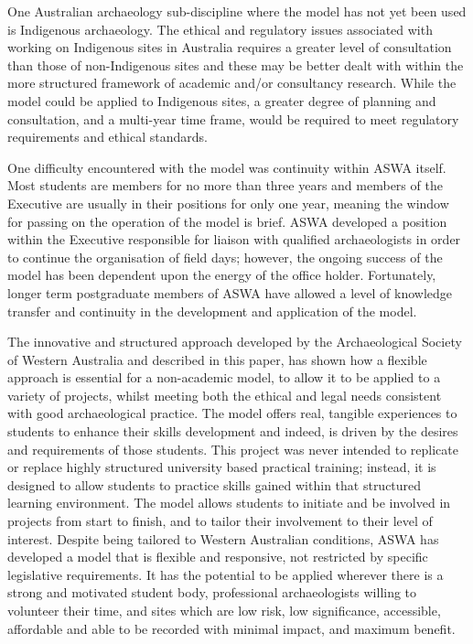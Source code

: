 \documentclass{ijsra}
\begin{document}
One Australian archaeology sub-discipline where the model has not yet been used is Indigenous archaeology. The ethical and regulatory issues associated with working on Indigenous sites in Australia requires a greater level of consultation than those of non-Indigenous sites and these may be better dealt with within the more structured framework of academic and/or consultancy research. 
While the model could be applied to Indigenous sites, a greater degree of planning and consultation, and a multi-year time frame, would be required to meet regulatory requirements and ethical standards.

One difficulty encountered with the model was continuity within ASWA itself. Most students are members for no more than three years and members of the Executive are usually in their positions for only one year, meaning the window for passing on the operation of the model is brief. 
ASWA developed a position within the Executive responsible for liaison with qualified archaeologists in order to continue the organisation of field days; however, the ongoing success of the model has been dependent upon the energy of the office holder. 
Fortunately, longer term postgraduate members of ASWA have allowed a level of knowledge transfer and continuity in the development and application of the model.


The innovative and structured approach developed by the Archaeological Society of Western Australia and described in this paper, has shown how a flexible approach is essential for a non-academic model, to allow it to be applied to a variety of projects, whilst meeting both the ethical and legal needs consistent with good archaeological practice. 
The model offers real, tangible experiences to students to enhance their skills development and indeed, is driven by the desires and requirements of those students. This project was never intended to replicate or replace highly structured university based practical training; instead, it is designed to allow students to practice skills gained within that structured learning environment. 
The model allows students to initiate and be involved in projects from start to finish, and to tailor their involvement to their level of interest. Despite being tailored to Western Australian conditions, ASWA has developed a model that is flexible and responsive, not restricted by specific legislative requirements. 
It has the potential to be applied wherever there is a strong and motivated student body, professional archaeologists willing to volunteer their time, and sites which are low risk, low significance, accessible, affordable and able to be recorded with minimal impact, and maximum benefit. 
\end{document}
